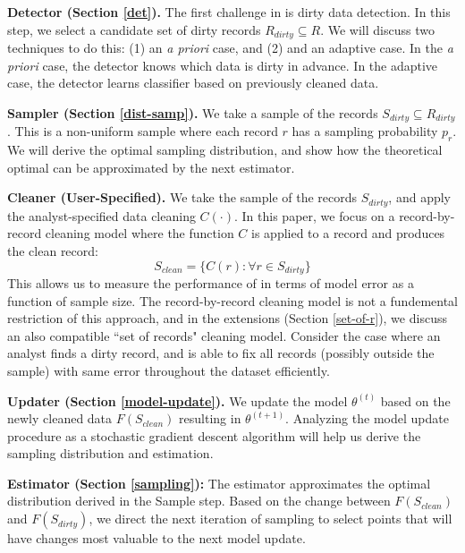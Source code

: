 \vspace{0.5em}

\noindent\textbf{Detector (Section \ref{det}). } The first challenge in \sys is dirty data detection. In this step, we select a candidate set of dirty records $R_{dirty} \subseteq R$. We will discuss two techniques to do this: (1) an \emph{a priori} case, and (2) and an adaptive case. In the \emph{a priori} case, the detector knows which data is dirty in advance. In the adaptive case, the detector learns classifier based on previously cleaned data.

\vspace{0.5em}

\noindent\textbf{Sampler (Section \ref{dist-samp}). } We take a sample of the records $S_{dirty} \subseteq R_{dirty}$. This is a non-uniform sample where each record $r$ has a sampling probability $p_r$.
We will derive the optimal sampling distribution, and show how the theoretical optimal can be approximated by the next estimator.

\vspace{0.5em}

\noindent\textbf{Cleaner (User-Specified). } We take the sample of the records $S_{dirty}$, and apply the analyst-specified data cleaning $C(\cdot)$. In this paper, we focus on a record-by-record cleaning model where the function $C$ is applied to a record and produces the clean record:
\[
S_{clean} = \{C(r) : \forall r \in S_{dirty}\}
\]
This allows us to measure the performance of \sys in terms of model error as a function of sample size. The record-by-record cleaning model is not a fundemental restriction of this approach, and in the extensions (Section \ref{set-of-r}), we discuss an also compatible ``set of records" cleaning model. Consider the case where an analyst finds a dirty record, and is able to fix all records (possibly outside the sample) with same error throughout the dataset efficiently.

\vspace{0.5em}

\noindent\textbf{Updater (Section \ref{model-update}). } We update the model $\theta^{(t)}$ based on the newly cleaned data $F(S_{clean})$ resulting in $\theta^{(t+1)}$. Analyzing the model update procedure as a stochastic gradient descent algorithm will help us derive the sampling distribution and estimation.

\vspace{0.5em}

\noindent\textbf{Estimator (Section \ref{sampling}): } The estimator approximates the optimal distribution derived in the Sample step. Based on the change between $F(S_{clean})$ and $F(S_{dirty})$, we direct the next iteration of sampling to select points that will have changes most valuable to the next model update.

